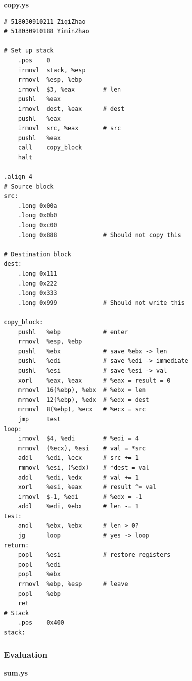 \documentclass[12pt,a4paper]{article}
\begin{document}
\begin{center}
        \textbf{copy.ys}
\end{center}
\begin{lstlisting}
# 518030910211 ZiqiZhao
# 518030910188 YiminZhao

# Set up stack
    .pos    0
    irmovl  stack, %esp
    rrmovl  %esp, %ebp
    irmovl  $3, %eax        # len
    pushl   %eax
    irmovl  dest, %eax      # dest
    pushl   %eax
    irmovl  src, %eax       # src
    pushl   %eax
    call    copy_block
    halt

.align 4
# Source block
src:
    .long 0x00a
    .long 0x0b0
    .long 0xc00
    .long 0x888             # Should not copy this

# Destination block
dest:
    .long 0x111
    .long 0x222
    .long 0x333
    .long 0x999             # Should not write this

copy_block:
    pushl   %ebp            # enter
    rrmovl  %esp, %ebp
    pushl   %ebx            # save %ebx -> len
    pushl   %edi            # save %edi -> immediate
    pushl   %esi            # save %esi -> val
    xorl    %eax, %eax      # %eax = result = 0
    mrmovl  16(%ebp), %ebx  # %ebx = len
    mrmovl  12(%ebp), %edx  # %edx = dest
    mrmovl  8(%ebp), %ecx   # %ecx = src
    jmp     test
loop:
    irmovl  $4, %edi        # %edi = 4
    mrmovl  (%ecx), %esi    # val = *src
    addl    %edi, %ecx      # src += 1
    rmmovl  %esi, (%edx)    # *dest = val
    addl    %edi, %edx      # val += 1
    xorl    %esi, %eax      # result ^= val
    irmovl  $-1, %edi       # %edx = -1
    addl    %edi, %ebx      # len -= 1
test:
    andl    %ebx, %ebx      # len > 0?
    jg      loop            # yes -> loop
return:
    popl    %esi            # restore registers
    popl    %edi
    popl    %ebx
    rrmovl  %ebp, %esp      # leave
    popl    %ebp
    ret
# Stack 
    .pos    0x400
stack:
\end{lstlisting}

\subsubsection{Evaluation}
\textbf{sum.ys}\\
\end{document}
